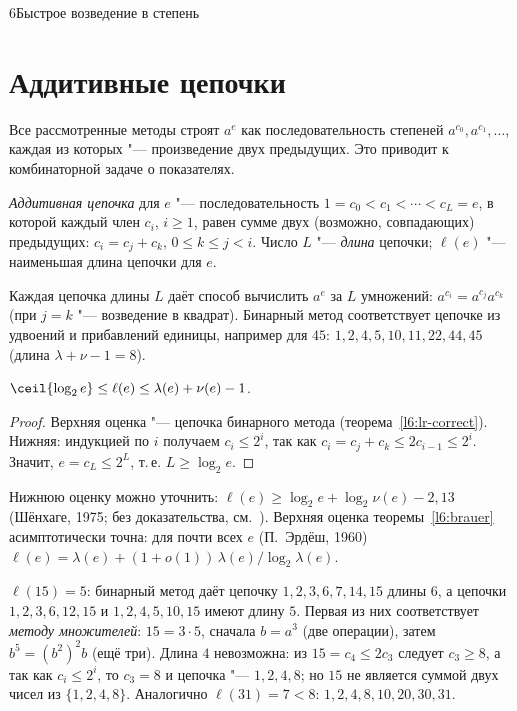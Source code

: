 \begin{lecture}{6}{Быстрое возведение в степень}
\section{Аддитивные цепочки}

Все рассмотренные методы строят $a^e$ как последовательность степеней $a^{c_0}, a^{c_1}, \dots$,
каждая из которых "--- произведение двух предыдущих. Это приводит к комбинаторной задаче о
показателях.

\begin{definition}
\emph{Аддитивная цепочка} для $e$ "--- последовательность $1 = c_0 < c_1 < \cdots < c_L = e$,
в которой каждый член $c_i$, $i \ge 1$, равен сумме двух (возможно, совпадающих) предыдущих:
$c_i = c_j + c_k$, $0 \le k \le j < i$. Число $L$ "--- \emph{длина} цепочки; $\ell(e)$ "---
наименьшая длина цепочки для $e$.
\end{definition}

Каждая цепочка длины $L$ даёт способ вычислить $a^e$ за $L$ умножений: $a^{c_i} = a^{c_j} a^{c_k}$
(при $j = k$ "--- возведение в квадрат). Бинарный метод соответствует цепочке из удвоений и
прибавлений единицы, например для $45$:
$1, 2, 4, 5, 10, 11, 22, 44, 45$ (длина $\lambda + \nu - 1 = 8$).

\begin{theorem}\label{l6:chain-bounds}
$\ceil{\log_2 e} \le \ell(e) \le \lambda(e) + \nu(e) - 1$.
\end{theorem}

\begin{proof}
Верхняя оценка "--- цепочка бинарного метода (теорема~\ref{l6:lr-correct}). Нижняя: индукцией
по $i$ получаем $c_i \le 2^i$, так как $c_i = c_j + c_k \le 2 c_{i-1} \le 2^i$. Значит,
$e = c_L \le 2^L$, т.\,е. $L \ge \log_2 e$.
\end{proof}

Нижнюю оценку можно уточнить: $\ell(e) \ge \log_2 e + \log_2 \nu(e) - 2{,}13$ (Шёнхаге, 1975;
без доказательства, см.~\cite[разд.~4.6.3]{knuth-taocp2}). Верхняя оценка
теоремы~\ref{l6:brauer} асимптотически точна: для почти всех $e$ (П.~Эрдёш, 1960)
$\ell(e) = \lambda(e) + (1 + o(1))\,\lambda(e)/\log_2 \lambda(e)$.

\begin{example}
$\ell(15) = 5$: бинарный метод даёт цепочку $1, 2, 3, 6, 7, 14, 15$ длины $6$, а цепочки
$1, 2, 3, 6, 12, 15$ и $1, 2, 4, 5, 10, 15$ имеют длину $5$. Первая из них соответствует
\emph{методу множителей}: $15 = 3 \cdot 5$, сначала $b = a^3$ (две операции), затем
$b^5 = (b^2)^2 b$ (ещё три). Длина $4$ невозможна: из $15 = c_4 \le 2c_3$ следует $c_3 \ge 8$,
а так как $c_i \le 2^i$, то $c_3 = 8$ и цепочка "--- $1, 2, 4, 8$; но $15$ не является суммой
двух чисел из $\{1, 2, 4, 8\}$. Аналогично
$\ell(31) = 7 < 8$: $1, 2, 4, 8, 10, 20, 30, 31$.
\end{example}


\end{lecture}
